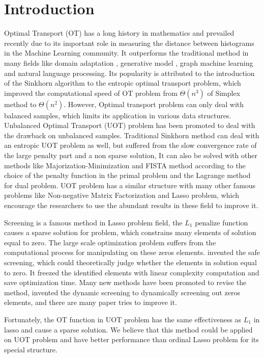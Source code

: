 \section{Introduction}
Optimal Transport (OT) has a long history in mathematics and prevailed recently due to its important role in measuring the distance between histograms in the Machine Learning community. It outperforms the traditional method in many fields like domain adaptation \citep{7586038}, generative model \citep{arjovsky2017wasserstein}, graph machine learning \citep{NEURIPS2019_fdd5b16f} and natural language processing. \citep{084adf2f555549c493e0331a00e4ecad} Its popularity is attributed to the introduction of the Sinkhorn algorithm to the entropic optimal transport problem, \citep{NIPS2013_af21d0c9} which improved the computational speed of OT problem from $\Theta (n^3)$ of Simplex method to $\Theta (n^2)$. However, Optimal transport problem can only deal with balanced samples, which limits its application in various data structures. Unbalanced Optimal Transport (UOT) problem has been promoted to deal with the drawback on unbalanced samples. Traditional Sinkhorn method can deal with an entropic UOT problem as well, but suffered from the slow convergence rate of the large penalty part and a non sparse solution, It can also be solved with other methods like Majorization-Minimization and FISTA method according to the choice of the penalty function in the primal problem and the Lagrange method for dual problem\citep{NEURIPS2021_c3c617a9}. UOT problem has a similar structure with many other famous problems like Non-negative Matrix Factorization and Lasso problem, which encourage the researchers to use the abundant results in these field to improve it.

Screening is a famous method in Lasso problem field, the $L_1$ penalize function causes a sparse solution for problem, which constrains many elements of solution equal to zero. The large scale optimization problem suffers from the computational process for manipulating on these zeros elements. \citep{ghaoui2010safe} invented the safe screening, which could theoretically judge whether the elements in solution equal to zero. It freezed the identified elements with linear complexity computation and save optimization time. Many new methods have been promoted to revise the method, \citep{JMLR:v18:16-577} invented the dynamic screening to dynamically screening out zeros elements, and there are many paper tries to improve it.  

Fortunately, the OT function in UOT problem has the same effectiveness as $L_1$ in lasso and cause a sparse solution. We believe that this method could be applied on UOT problem and have better performance than ordinal Lasso problem for its special structure.

